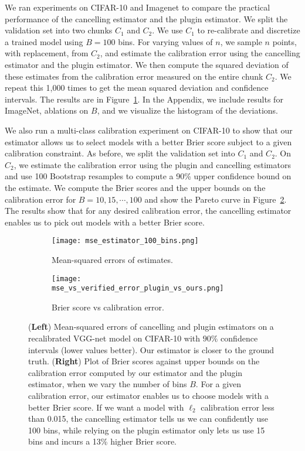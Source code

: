 We ran experiments on CIFAR-10 and Imagenet to compare the practical performance of the cancelling estimator and the plugin estimator. We split the validation set into two chunks $C_1$ and $C_2$. We use $C_1$ to re-calibrate and discretize a trained model using $B = 100$ bins. For varying values of $n$, we sample $n$ points, with replacement, from $C_2$, and estimate the calibration error using the cancelling estimator and the plugin estimator. We then compute the squared deviation of these estimates from the calibration error measured on the entire chunk $C_2$. We repeat this 1,000 times to get the mean squared deviation and confidence intervals. The results are in Figure~\ref{fig:mse_estimators}. In the Appendix, we include results for ImageNet, ablations on $B$, and we visualize the histogram of the deviations.

We also run a multi-class calibration experiment on CIFAR-10 to show that our estimator allows us to select models with a better Brier score subject to a given calibration constraint. As before, we split the validation set into $C_1$ and $C_2$. On $C_2$, we estimate the calibration error using the plugin and cancelling estimators and use 100 Bootstrap resamples to compute a 90\% upper confidence bound on the estimate. We compute the Brier scores and the upper bounds on the calibration error for $B = 10, 15, \cdots, 100$ and show the Pareto curve in Figure~\ref{fig:mse_vs_ce_estimators}. The results show that for any desired calibration error, the cancelling estimator enables us to pick out models with a better Brier score.

\begin{figure}
  \centering
  \centering
     \begin{subfigure}[b]{0.45\textwidth}
         \centering
         \texttt{[image: mse\_estimator\_100\_bins.png]}
         \caption{Mean-squared errors of estimates.}
         \label{fig:mse_estimators}
     \end{subfigure}
     \hfill
     \begin{subfigure}[b]{0.45\textwidth}
         \centering
         \texttt{[image: mse\_vs\_verified\_error\_plugin\_vs\_ours.png]}
         \caption{Brier score vs calibration error.}
         \label{fig:mse_vs_ce_estimators}
     \end{subfigure}
  \caption{
  (\textbf{Left}) Mean-squared errors of cancelling and plugin estimators on a recalibrated VGG-net model on CIFAR-10 with $90\%$ confidence intervals (lower values better). Our estimator is closer to the ground truth.
  (\textbf{Right}) Plot of Brier scores against upper bounds on the calibration error computed by our estimator and the plugin estimator, when we vary the number of bins $B$. For a given calibration error, our estimator enables us to choose models with a better Brier score. If we want a model with $\ell_2$ calibration error less than 0.015, the cancelling estimator tells us we can confidently use 100 bins, while relying on the plugin estimator only lets us use 15 bins and incurs a 13\% higher Brier score.
  }
  \label{fig:mse_estimators_bins}
\end{figure}

